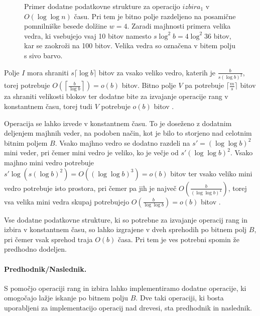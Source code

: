 \begin{figure}[htb]
    \begin{center}
        
        \caption{Primer dodatne podatkovne strukture za operacijo $izbira_1$ v $O(\log\log{n})$ času. Pri tem je bitno polje razdeljeno na posamične pomnilniške besede dolžine $w=4$. Zaradi majhnosti primera velika vedra, ki vsebujejo vsaj 10 bitov namesto $s\log^2b= 4\log^2{36}$ bitov, kar se zaokroži na 100 bitov. Velika vedra so označena v bitem polju s sivo barvo.} 
        \label{fig:select}
    \end{center}
\end{figure}

Polje $I$ mora shraniti $s\lceil\log b\rceil$ bitov za vsako veliko vedro, katerih je $\frac{b}{s(\log b)^2}$, torej potrebuje $O\left(\left\lceil\frac{b}{\log b}\right\rceil\right)=o(b)$ bitov. Bitno polje $V$ pa potrebuje $\lceil \frac{m}{s} \rceil$ bitov za shraniti velikosti blokov ter dodatne bite za izvajanje operacije rang v konstantnem času, torej tudi $V$ potrebuje $o(b)$ bitov \cite{Navarro2016}.

Operacija se lahko izvede v konstantnem času. To je doseženo z dodatnim deljenjem majhnih veder, na podoben način, kot je bilo to storjeno nad celotnim bitnim poljem $B$. Vsako majhno vedro se dodatno razdeli na $s'=(\log\log b)^2$ mini veder, pri čemer mini vedro je veliko, ko je večje od $s'(\log\log b)^2$. Vsako majhno mini vedro potrebuje $s'\log{(s(\log{b})^2)}=O((\log\log b)^3)=o(b)$ bitov ter vsako veliko mini vedro potrebuje isto prostora, pri čemer pa jih je največ $O\left(\frac{b}{(\log\log b)^4}\right)$, torej vsa velika mini vedra skupaj potrebujejo $O\left(\frac{b}{\log\log b}\right) =o(b)$ bitov \cite{Navarro2016}.


Vse dodatne podatkovne strukture, ki so potrebne za izvajanje operacij rang in izbira v konstantnem času, so lahko izgrajene v dveh sprehodih po bitnem polj $B$, pri čemer vsak sprehod traja $O(b)$ časa. Pri tem je ves potrebni spomin že predhodno dodeljen.

\paragraph{Predhodnik/Naslednik.}
S pomočjo operaciji rang in izbira lahko implementiramo dodatne operacije, ki omogočajo lažje iskanje po bitnem polju $B$. Dve taki operaciji, ki bosta uporabljeni za implementacijo operacij nad drevesi, sta predhodnik in naslednik.

